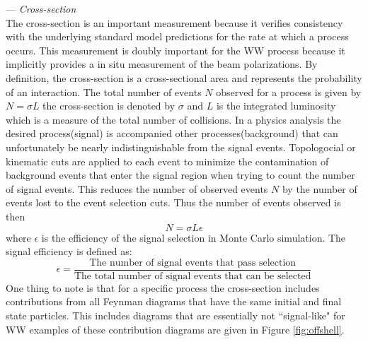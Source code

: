 --- \textit{Cross-section}\\
The cross-section is an important measurement because it verifies consistency with the underlying standard model predictions for the rate at which a process occurs. This measurement is doubly important for the WW process because it implicitly provides a in situ measurement of the beam polarizations. By definition, the cross-section is a cross-sectional area and represents the probability of an interaction. The total number of events $N$ observed for a process is given by $ N= \sigma L$ the cross-section is denoted by $\sigma$ and $L$ is the integrated luminosity which is a measure of the total number of collisions. In a physics analysis the desired process(signal) is accompanied other processes(background) that can unfortunately be nearly indistinguishable from the signal events. Topologocial or kinematic cuts are applied to each event to minimize the contamination of background events that enter the signal region when trying to count the number of signal events. This reduces the number of observed events $N$ by the number of events lost to the event selection cuts. Thus the number of events observed is then 
\begin{equation}
N = \sigma  L  \epsilon
\end{equation}
where $\epsilon$ is the efficiency of the signal selection in Monte Carlo simulation. The signal efficiency is defined as:
 \begin{equation}
\epsilon = \frac{\text{The number of signal events that pass selection}}{ \text{The total number of signal events that can be selected}}
\end{equation} 
One thing to note is that for a specific process the cross-section includes contributions from all Feynman diagrams that have the same initial and final state particles. This includes diagrams that are essentially not ``signal-like" for WW examples of these contribution diagrams are given in Figure \ref{fig:offshell}.


